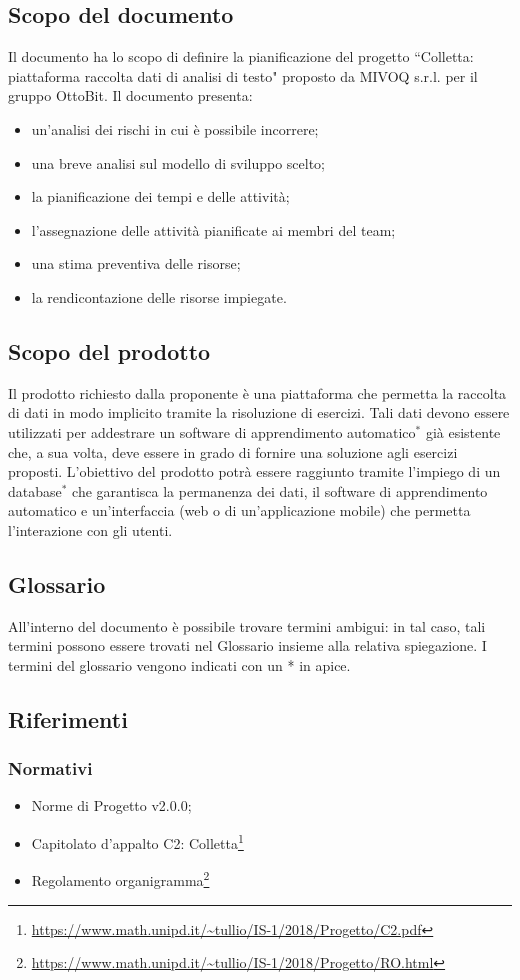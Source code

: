 \subsection{Scopo del documento}
	Il documento ha lo scopo di definire la pianificazione del progetto ``Colletta: piattaforma raccolta dati di analisi di testo" proposto da MIVOQ s.r.l. per il gruppo OttoBit. Il documento presenta:
	\begin{itemize}
		\item un'analisi dei rischi in cui è possibile incorrere;
		\item una breve analisi sul modello di sviluppo scelto;
		\item la pianificazione dei tempi e delle attività;
		\item l'assegnazione delle attività pianificate ai membri del team;
		\item una stima preventiva delle risorse;
		\item la rendicontazione delle risorse impiegate.
	\end{itemize}

\subsection{Scopo del prodotto}
	Il prodotto richiesto dalla proponente è una piattaforma che permetta la raccolta di dati in modo implicito tramite la risoluzione di esercizi. Tali dati devono essere utilizzati per addestrare un software di apprendimento automatico$^*$ già esistente che, a sua volta, deve essere in grado di fornire una soluzione agli esercizi proposti. L'obiettivo del prodotto potrà essere raggiunto tramite l'impiego di un database$^*$ che garantisca la permanenza dei dati, il software di apprendimento automatico e un'interfaccia (web o di un'applicazione mobile) che permetta l'interazione con gli utenti.

\subsection{Glossario}
	All'interno del documento è possibile trovare termini ambigui: in tal caso, tali termini possono essere trovati nel Glossario insieme alla relativa spiegazione. I termini del glossario vengono indicati con un * in apice.
	
\subsection{Riferimenti}
	\subsubsection{Normativi}
		\begin{itemize}
			\item Norme di Progetto v2.0.0;
			\item Capitolato d'appalto C2: Colletta\footnote{\url{https://www.math.unipd.it/~tullio/IS-1/2018/Progetto/C2.pdf}}
			\item Regolamento organigramma\footnote{\url{https://www.math.unipd.it/~tullio/IS-1/2018/Progetto/RO.html}}
		\end{itemize}
